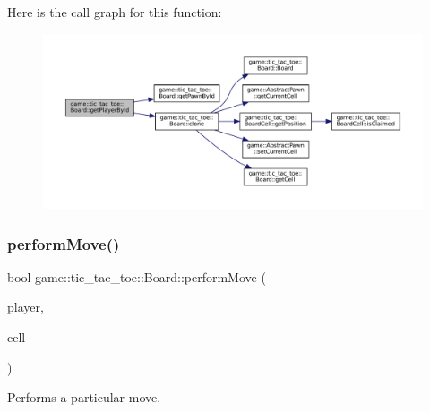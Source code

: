 Here is the call graph for this function\+:
\nopagebreak
\begin{figure}[H]
\begin{center}
\leavevmode
\includegraphics[width=350pt]{classgame_1_1tic__tac__toe_1_1_board_a7907b8fc363b7e33d585edbc7ec102ae_cgraph}
\end{center}
\end{figure}
\mbox{\label{classgame_1_1tic__tac__toe_1_1_board_a08d914b0a618b2e35dcd5016ceba1b23}} 
\subsubsection{\texorpdfstring{perform\+Move()}{performMove()}}
{\footnotesize\ttfamily bool game\+::tic\+\_\+tac\+\_\+toe\+::\+Board\+::perform\+Move (\begin{DoxyParamCaption}\item[{\hyperlink{classgame_1_1tic__tac__toe_1_1_player}{Player} $\ast$}]{player,  }\item[{\hyperlink{classgame_1_1tic__tac__toe_1_1_board_cell}{Board\+Cell} $\ast$}]{cell }\end{DoxyParamCaption})\hspace{0.3cm}{\ttfamily [override]}}



Performs a particular move. 


